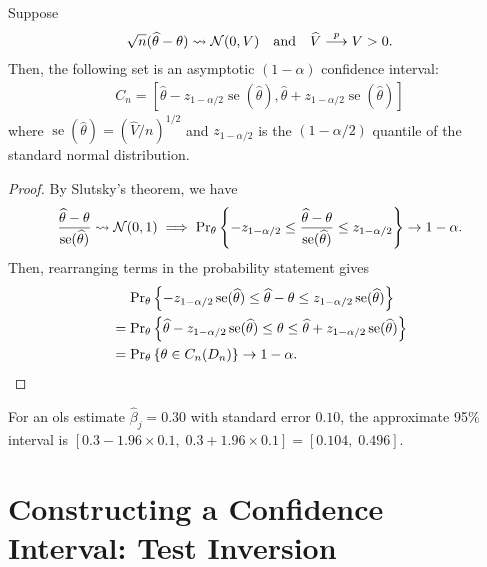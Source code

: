\documentclass[a4paper,12pt]{article}
\begin{document}
\begin{theorem}
	Suppose
	\begin{align}
		\sqrt n(\widehat\theta-\theta)\overset{}{\leadsto}\operatorname{\mathcal{N}}(0,V)
		\quad\text{and}\quad
		\widehat V\overset{p}{\longrightarrow} V>0.
	\end{align}
	Then, the following set is an asymptotic $(1-\alpha)$ confidence interval:
	\begin{align}\label{eq-normal-ci}
		C_n=\left[\widehat\theta-z_{1-\alpha/2}\operatorname{se}(\widehat\theta),
		\widehat\theta+z_{1-\alpha/2}\operatorname{se}(\widehat\theta)\right]
	\end{align}
	where $\operatorname{se}(\widehat\theta)=(\widehat V/n)^{1/2}$ and
	$z_{1-\alpha/2}$ is the $(1-\alpha/2)$ quantile of the standard normal distribution.
\end{theorem}
\begin{proof}
	By Slutsky's theorem, we have
	\begin{align}
		\frac{\widehat\theta-\theta}{\operatorname{se}(\widehat\theta)}\overset{}{\leadsto}\operatorname{\mathcal{N}}(0,1)
		\implies \operatorname{\text{Pr}}_\theta\left\{-z_{1-\alpha/2} \leq \frac{\widehat\theta-\theta}{\operatorname{se}(\widehat\theta)}\le z_{1-\alpha/2}\right\}\to1-\alpha.
	\end{align}
	Then, rearranging terms in the probability statement gives
	\begin{align*}
		&\raum \Pr_\theta\left\{-z_{1-\alpha/2}\operatorname{se}(\widehat\theta)\leq \widehat\theta-\theta \leq z_{1-\alpha/2}\operatorname{se}(\widehat\theta)\right\} \\
		&= \Pr_\theta\left\{\widehat\theta-z_{1-\alpha/2}\operatorname{se}(\widehat\theta)\leq \theta \leq \widehat\theta+z_{1-\alpha/2}\operatorname{se}(\widehat\theta)\right\} \\
		&= \Pr_\theta\left\{\theta \in C_n(D_n)\right\}\to 1-\alpha.
		\qedhere
	\end{align*}
\end{proof}

\begin{example}\label{ex-ols-ci}
	For an \gls{ols} estimate $\widehat\beta_j=0.30$ with standard error $0.10$,
	the approximate 95\% interval is $[0.3 - 1.96\times 0.1,\; 0.3 + 1.96\times 0.1]=[0.104,\;0.496]$.
\end{example}

\section{Constructing a Confidence Interval: Test Inversion}
\end{document}
